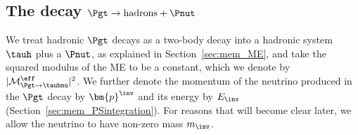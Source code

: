 \subsection{The decay $\Pgt \to \textrm{hadrons} + \Pnut$}
\label{sec:appendix_tauToHadDecays}

We treat hadronic $\Pgt$ decays as a two-body decay into a hadronic
system $\tauh$ plus a $\Pnut$,
as explained in Section~\ref{sec:mem_ME},
and take the squared modulus of the ME to be a constant,
which we denote by $\vert\mathcal{M}^{\eff}_{\Pgt \to \tauhnu}\vert^{2}$.
We further denote the momentum of the neutrino produced in the $\Pgt$ decay by
$\bm{p}^{\inv}$ and its energy by $E_{\inv}$ (\cf Section~\ref{sec:mem_PSintegration}).
For reasons that will become clear later, we allow the neutrino to
have non-zero mass $m_{\inv}$.

